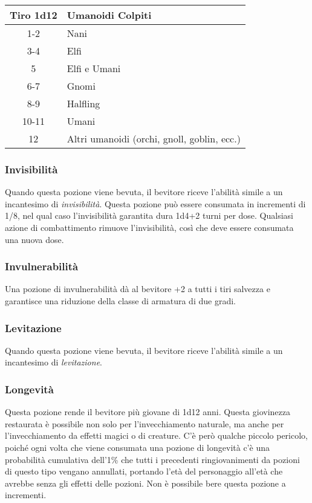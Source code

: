 \documentclass{article}
\begin{document}
\begin{multicols}{2}
\begin{table}[h]
\centering
\begin{tabular}{|c|l|}
\hline
\textbf{Tiro 1d12} & \textbf{Umanoidi Colpiti} \\
\hline
1-2 & Nani \\
3-4 & Elfi \\
5 & Elfi e Umani \\
6-7 & Gnomi \\
8-9 & Halfling \\
10-11 & Umani \\
12 & Altri umanoidi (orchi, gnoll, goblin, ecc.) \\
\hline
\end{tabular}

\end{table}

\subsubsection{Invisibilità}
Quando questa pozione viene bevuta, il bevitore riceve l'abilità simile a un incantesimo di \textit{invisibilità}. Questa pozione può essere consumata in incrementi di 1/8, nel qual caso l'invisibilità garantita dura 1d4+2 turni per dose. Qualsiasi azione di combattimento rimuove l'invisibilità, così che deve essere consumata una nuova dose.

\subsubsection{Invulnerabilità}
Una pozione di invulnerabilità dà al bevitore +2 a tutti i tiri salvezza e garantisce una riduzione della classe di armatura di due gradi.

\subsubsection{Levitazione}
Quando questa pozione viene bevuta, il bevitore riceve l'abilità simile a un incantesimo di \textit{levitazione}.

\subsubsection{Longevità}
Questa pozione rende il bevitore più giovane di 1d12 anni. Questa giovinezza restaurata è possibile non solo per l'invecchiamento naturale, ma anche per l'invecchiamento da effetti magici o di creature. C'è però qualche piccolo pericolo, poiché ogni volta che viene consumata una pozione di longevità c'è una probabilità cumulativa dell'1\% che tutti i precedenti ringiovanimenti da pozioni di questo tipo vengano annullati, portando l'età del personaggio all'età che avrebbe senza gli effetti delle pozioni. Non è possibile bere questa pozione a incrementi.


\end{multicols}
\end{document}
